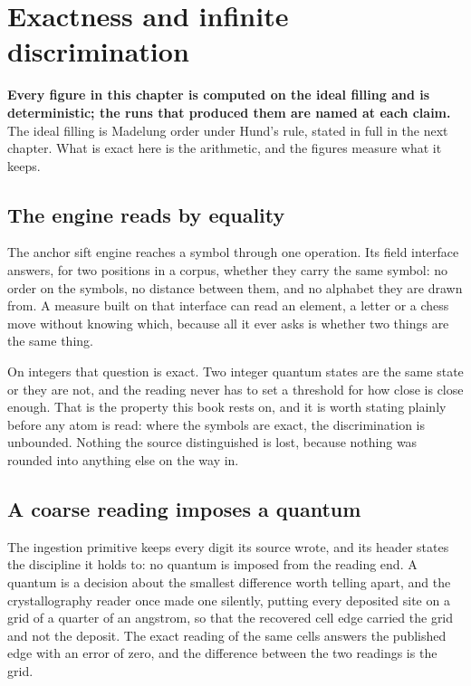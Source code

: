 \chapter{Exactness and infinite discrimination}

\textbf{Every figure in this chapter is computed on the ideal filling and is deterministic; the runs
that produced them are named at each claim.} The ideal filling is Madelung order under Hund's rule,
stated in full in the next chapter. What is exact here is the arithmetic, and the figures measure what
it keeps.

\section{The engine reads by equality}

The anchor sift engine reaches a symbol through one operation. Its field interface answers, for two
positions in a corpus, whether they carry the same symbol: no order on the symbols, no distance
between them, and no alphabet they are drawn from. A measure built on that interface can read an
element, a letter or a chess move without knowing which, because all it ever asks is whether two
things are the same thing.

On integers that question is exact. Two integer quantum states are the same state or they are not,
and the reading never has to set a threshold for how close is close enough. That is the property this
book rests on, and it is worth stating plainly before any atom is read: where the symbols are exact,
the discrimination is unbounded. Nothing the source distinguished is lost, because nothing was
rounded into anything else on the way in.

\section{A coarse reading imposes a quantum}

The ingestion primitive keeps every digit its source wrote, and its header states the discipline it
holds to: no quantum is imposed from the reading end. A quantum is a decision about the smallest
difference worth telling apart, and the crystallography reader once made one silently, putting every
deposited site on a grid of a quarter of an angstrom, so that the recovered cell edge carried the
grid and not the deposit. The exact reading of the same cells answers the published edge with an
error of zero, and the difference between the two readings is the grid.


